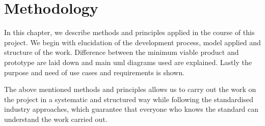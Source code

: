 \section{Methodology} \label{sec:methodology}

In this chapter, we describe methods and principles applied in the course of this project. We begin with elucidation of the development process, model applied and structure of the work. Difference between the minimum viable product and prototype are laid down and main \acrshort{uml} diagrams used are explained. Lastly the purpose and need of use cases and requirements is shown.








\bigskip\noindent
The above mentioned methods and principles allows us to carry out the work on the project in a systematic and structured way while following the standardised industry approaches, which guarantee that everyone who knows the standard can understand the work carried out.